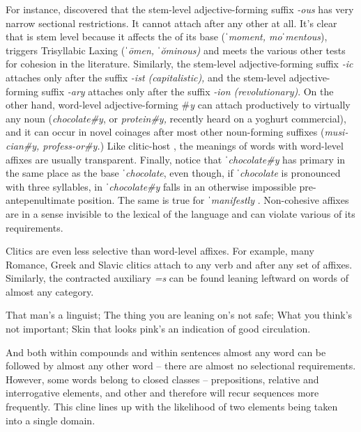 \documentclass[output=paper,
modfonts
]{LSP/langsci}
\begin{document}
\begin{exe}
\noindent For instance, \citet{fabb1988} discovered that the  stem-level adjective-forming suffix \textit{{}-ous} has very narrow sectional restrictions. It cannot attach after any other  at all. It’s clear that  is stem level because it affects the  of its base (\textit{ˈ}\textit{moment, mo}\textit{ˈ}\textit{mentous}), triggers Trisyllabic Laxing (\textit{ˈ}\textit{\=o}\textit{men,} \textit{ˈ}\textit{\u{o}}\textit{minous)} and meets the various other tests for cohesion in the literature. Similarly, the stem-level adjective-forming suffix \textit{{}-ic} attaches only after the suffix \textit{{}-ist (capitalistic),} and the stem-level adjective-forming suffix \textit{{}-ary} attaches only after the suffix\textit{ -ion (revolutionary)}. On the other hand, word-level adjective-forming \#\textit{y} can attach productively to virtually any noun (\textit{chocolate\#y}, or \textit{protein\#y,} recently heard on a yoghurt commercial), and it can occur in novel coinages after most other noun-forming suffixes (\textit{musi-cian\#y, profess-or\#y.}) Like clitic-host , the meanings of words with word-level affixes are usually transparent. Finally, notice that ˈ\textit{chocolate\#y} has primary  in the same place as the base ˈ\textit{chocolate}, even though, if ˈ\textit{chocolate} is pronounced with three syllables,  in ˈ\textit{chocolate\#y} falls in an otherwise impossible pre-antepenultimate position. The same is true for ˈ\textit{manifestly} . Non-cohesive affixes are in a sense invisible to the lexical  of the language and can violate various of its requirements. 

Clitics are even less selective than word-level affixes. For example, many Romance, Greek and Slavic clitics attach to any verb and after any set of affixes. Similarly, the  contracted auxiliary \textit{=s} can be found leaning leftward on words of almost any category. 

\ea \label{ex:kaisse:15} 
	\ea \label{ex:kaisse:15a} That man’s a linguist; 
	\ex \label{ex:kaisse:15b} The thing you are leaning on’s not safe; 
	\ex \label{ex:kaisse:15c} What you think’s not important;
	\ex \label{ex:kaisse:15d} Skin that looks pink’s an indication of good circulation.
	\z
\z

\noindent And both within compounds and within sentences almost any word can be followed by almost any other word -- there are almost no selectional requirements. However, some words belong to closed classes -- prepositions, relative and interrogative elements, and other  and therefore will recur sequences more frequently. This cline lines up with the likelihood of two elements being taken into a single  domain.


\end{exe}
\end{document}
